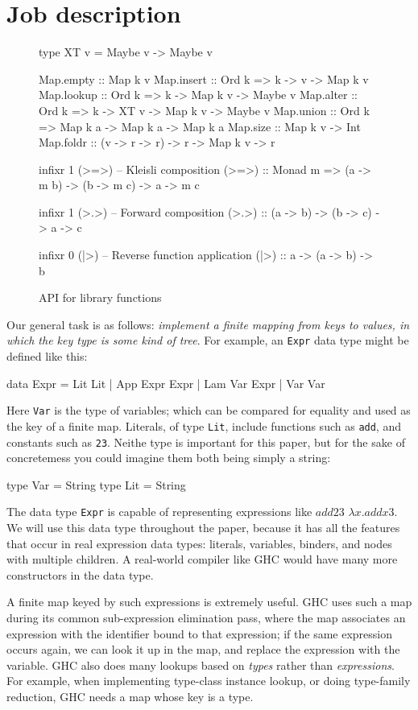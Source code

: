 \documentclass[acmsmall]{acmart}
\theoremstyle{theorem}
\theoremstyle{definition}
\theoremstyle{remark}
\newenvironment{figurebox}{\begin{figure}}{\end{figure}}
\begin{document}
\section{Job description}
\begin{figurebox}
\begin{code}
type XT v = Maybe v -> Maybe v

Map.empty  :: Map k v
Map.insert :: Ord k => k -> v -> Map k v
Map.lookup :: Ord k => k -> Map k v -> Maybe v
Map.alter  :: Ord k => k -> XT v -> Map k v -> Maybe v
Map.union  :: Ord k => Map k a -> Map k a -> Map k a
Map.size   :: Map k v -> Int
Map.foldr  :: (v -> r -> r) -> r -> Map k v -> r


infixr 1 (>=>)  -- Kleisli composition
(>=>) :: Monad m => (a -> m b) -> (b -> m c) -> a -> m c

infixr 1 (>.>)   -- Forward composition
(>.>)  :: (a -> b) -> (b -> c) -> a -> c

infixr 0 (|>)   -- Reverse function application
(|>)  :: a -> (a -> b) -> b
\end{code}
\caption{API for library functions}
\label{fig:containers} \label{fig:library}
\end{figurebox}

Our general task is as follows: \emph{implement a finite mapping from keys to values,
in which the key type is some kind of tree}.
For example, an \lstinline{Expr} data type might be defined like this:
\begin{code}
data Expr = Lit Lit | App Expr Expr | Lam  Var Expr | Var Var
\end{code}
Here \lstinline{Var} is the type of variables; which can be compared for
equality and used as the key of a finite map.  Literals, of type \lstinline{Lit},
include functions such as \lstinline{add}, and constants such as \lstinline{23}.
Neithe type is important for this paper, but for the sake of concretemess
you could imagine them both being simply a string:
\begin{code}
  type Var = String
  type Lit = String
\end{code}
The data type \lstinline{Expr} is capable of representing expressions like $add 2 3$
$\lambda x. add x 3$.  We will use this data type throughout the paper, because it
has all the features that occur in real expression data types: literals, variables,
binders, and nodes with multiple children.  A real-world compiler like GHC would have
many more constructors in the data type.

A finite map keyed by such expressions is extremely useful.
GHC uses such a map during its common sub-expression
elimination pass, where the map associates an
expression with the identifier bound to that expression; if the same
expression occurs again, we can look it up in the map, and replace the
expression with the variable.
GHC also does many lookups based on \emph{types} rather than
\emph{expressions}.  For example, when implementing type-class
instance lookup, or doing type-family reduction, GHC needs a map whose
key is a type.
\end{document}
